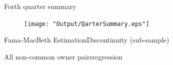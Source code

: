 \documentclass{beamer}
\begin{document}
%
		
\begin{frame}{Forth quarter summary}\label{Monthly21}
		\begin{figure}
			\centering  
			\texttt{[image: "Output/QarterSummary.eps"]}
		\end{figure}
\end{frame}		
		
\begin{frame}{Fama-MacBeth Estimation}{Discontinuity (sub-sample)}
\label{Monthly9} 

\begin{table}[htbp]
	\centering
	\resizebox{0.8\textwidth}{!}{
		
	}
\end{table}	
	\end{frame}



\begin{frame}{All non-common owner pairs}{regression}
	\begin{table}[htbp]
		\centering
		\resizebox{1\textwidth}{!}{
			
		}
	\end{table}
\end{frame}

%	
%			
	
\end{document}
